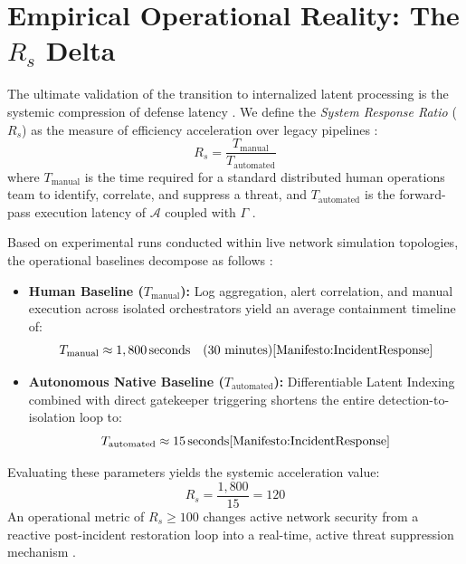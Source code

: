 \section{\texorpdfstring{Empirical Operational Reality: The $R_s$ Delta}{Empirical Operational Reality: The Rs Delta}}
The ultimate validation of the transition to internalized latent processing is the systemic compression of defense latency \cite{DLI:MemoryIntegration}. We define the \textit{System Response Ratio} ($R_s$) as the measure of efficiency acceleration over legacy pipelines \cite{Manifesto:IncidentResponse}:
\begin{equation}
    R_s = \frac{T_{\text{manual}}}{T_{\text{automated}}}
\end{equation}
where $T_{\text{manual}}$ is the time required for a standard distributed human operations team to identify, correlate, and suppress a threat, and $T_{\text{automated}}$ is the forward-pass execution latency of $\mathcal{A}$ coupled with $\Gamma$ \cite{Manifesto:IncidentResponse}.

Based on experimental runs conducted within live network simulation topologies, the operational baselines decompose as follows \cite{DLI:MemoryIntegration}:
\begin{itemize}
    \item \textbf{Human Baseline ($T_{\text{manual}}$):} Log aggregation, alert correlation, and manual execution across isolated orchestrators yield an average containment timeline of:
    \begin{equation}
        T_{\text{manual}} \approx 1,800\,\text{seconds} \quad (30 \text{ minutes}) \cite{Manifesto:IncidentResponse}
    \end{equation}
    \item \textbf{Autonomous Native Baseline ($T_{\text{automated}}$):} Differentiable Latent Indexing combined with direct gatekeeper triggering shortens the entire detection-to-isolation loop to:
    \begin{equation}
        T_{\text{automated}} \approx 15\,\text{seconds} \cite{Manifesto:IncidentResponse}
    \end{equation}
\end{itemize}

Evaluating these parameters yields the systemic acceleration value:
\begin{equation}
    R_s = \frac{1,800}{15} = 120
\end{equation}
An operational metric of $R_s \ge 100$ changes active network security from a reactive post-incident restoration loop into a real-time, active threat suppression mechanism \cite{Manifesto:IncidentResponse}.